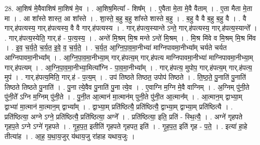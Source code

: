 \documentclass[17pt]{extarticle}
\begin{document}
28. आ॒शिष॑ मे॒वैवाशिष॑ मा॒शिष॑ मे॒व । . आ॒शिष॒मित्या᳚ - शिष᳚म् । . ए॒वैता मे॒ता मे॒वै वैताम् । . ए॒ता मैता मे॒ता मा । . आ शा᳚स्ते शास्त॒ आ शा᳚स्ते । . शा॒स्ते॒ ब॒हु ब॒हु शा᳚स्ते शास्ते ब॒हु । . ब॒हु वै वै ब॒हु ब॒हु वै । . वै गार्.ह॑पत्यस्य॒ गार्.ह॑पत्यस्य॒ वै वै गार्.ह॑पत्यस्य । . गार्.ह॑पत्य॒स्यान्ते ऽन्ते॒ गार्.ह॑पत्यस्य॒ गार्.ह॑पत्य॒स्यान्ते᳚ । . गार्.ह॑पत्य॒स्येति॒ गार्.ह॑ - प॒त्य॒स्य॒ । . अन्ते॑ मि॒श्रम् मि॒श्र मन्ते ऽन्ते॑ मि॒श्रम् । . मि॒श्र मि॑वे व मि॒श्रम् मि॒श्र मि॑व । . इ॒व॒ च॒र्य॒ते॒ च॒र्य॒त॒ इ॒वे॒ व॒ च॒र्य॒ते॒ । . च॒र्य॒त॒ आ॒ग्नि॒पा॒व॒मा॒नीभ्या॑ माग्निपावमा॒नीभ्या᳚म् चर्यते चर्यत आग्निपावमा॒नीभ्या᳚म् । . आ॒ग्नि॒पा॒व॒मा॒नीभ्या॒म् गार्.ह॑पत्य॒म् गार्.ह॑पत्य माग्निपावमा॒नीभ्या॑ माग्निपावमा॒नीभ्या॒म् गार्.ह॑पत्यम् । . आ॒ग्नि॒पा॒व॒मा॒नीभ्या॒मित्या᳚ग्नि - पा॒व॒मा॒नीभ्या᳚म् । . गार्.ह॑पत्य॒ मुपोप॒ गार्.ह॑पत्य॒म् गार्.ह॑पत्य॒ मुप॑ । . गार्.ह॑पत्य॒मिति॒ गार्.ह॑ - प॒त्य॒म् । . उप॑ तिष्ठते तिष्ठत॒ उपोप॑ तिष्ठते । . ति॒ष्ठ॒ते॒ पु॒नाति॑ पु॒नाति॑ तिष्ठते तिष्ठते पु॒नाति॑ । . पु॒ना त्ये॒वैव पु॒नाति॑ पु॒ना त्ये॒व । . ए॒वाग्नि म॒ग्नि मे॒वै वाग्निम् । . अ॒ग्निम् पु॑नी॒ते पु॑नी॒ते᳚ ऽग्नि म॒ग्निम् पु॑नी॒ते । . पु॒नी॒त आ॒त्मान॑ मा॒त्मान॑म् पुनी॒ते पु॑नी॒त आ॒त्मान᳚म् । . आ॒त्मान॒म् द्वाभ्या॒म् द्वाभ्या॑ मा॒त्मान॑ मा॒त्मान॒म् द्वाभ्या᳚म् । . द्वाभ्या॒म् प्रति॑ष्ठित्यै॒ प्रति॑ष्ठित्यै॒ द्वाभ्या॒म् द्वाभ्या॒म् प्रति॑ष्ठित्यै । . प्रति॑ष्ठित्या॒ अग्ने ऽग्ने॒ प्रति॑ष्ठित्यै॒ प्रति॑ष्ठित्या॒ अग्ने᳚ । . प्रति॑ष्ठित्या॒ इति॒ प्रति॑ - स्थि॒त्यै॒ । . अग्ने॑ गृहपते गृहप॒ते ऽग्ने ऽग्ने॑ गृहपते । . गृ॒ह॒प॒त॒ इतीति॑ गृहपते गृहपत॒ इति॑ । . गृ॒ह॒प॒त॒ इति॑ गृह - प॒ते॒ । . इत्या॑ हा॒हे तीत्या॑ह । . आ॒ह॒ य॒था॒य॒जुर् य॑थाय॒जु रा॑हाह यथाय॒जुः । \newline
\end{document}
